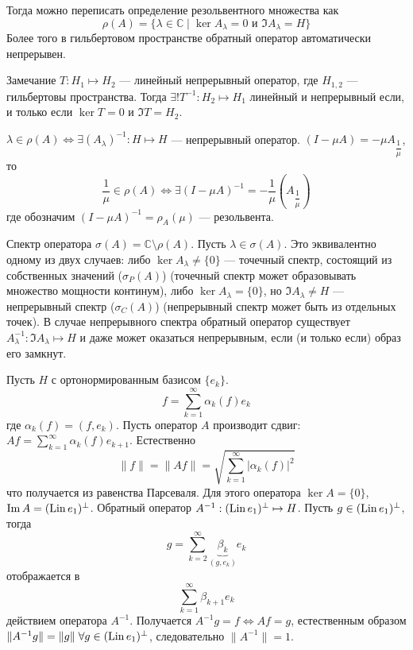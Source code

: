 \documentclass[14pt]{extarticle}
\begin{document}
Тогда можно переписать определение резольвентного множества как 
$$
\rho(A) = \{\lambda \in \mathbb C \mid \ker A_\lambda = 0\text{ и }\Im A_\lambda = H \}
$$
Более того в гильбертовом пространстве обратный оператор автоматически непрерывен.

\begin{MathCl}{Замечание}
    $T:H_1 \mapsto H_2$ --- линейный непрерывный оператор, где $H_{1,2}$ --- гильбертовы пространства.
    Тогда $\exists! T^{-1} : H_2 \mapsto H_1$ линейный и непрерывный если, и только если $\ker T = 0$ и $\Im T = H_2$.
\end{MathCl}

    $\lambda \in \rho(A) \Leftrightarrow \exists(A_\lambda)^{-1} : H \mapsto H$ --- непрерывный оператор.
    $(I - \mu A) = -\mu A_{\dfrac{1}{\mu}}$, то 
    $$
    \dfrac{1}{\mu} \in \rho(A) \Leftrightarrow \exists (I - \mu A)^{-1} = -\dfrac{1}{\mu}(A_{\dfrac{1}{\mu}})
    $$
    где обозначим $(I - \mu A)^{-1} = \rho_A(\mu)$ --- резольвента.
\begin{Opr}
    Спектр оператора $\sigma(A) = \mathbb C \setminus \rho(A)$. Пусть $\lambda \in \sigma(A)$.
    Это эквивалентно одному из двух случаев:
    либо $\ker A_\lambda \ne \{0\}$ --- точечный спектр, состоящий из собственных значений ($\sigma_P(A)$) (точечный спектр может образовывать множество мощности континум),
    либо $\ker A_\lambda = \{0\}$, но $\Im A_\lambda \ne H$ --- непрерывный спектр ($\sigma_C(A)$) (непрерывный спектр может быть из отдельных точек).
    В случае непрерывного спектра обратный оператор существует $A_\lambda^{-1} : \Im A_\lambda \mapsto H$ и даже может оказаться непрерывным, если (и только если) образ его
    замкнут.
\end{Opr}

\begin{Prim}
    Пусть $H$ с ортонормированным базисом $\{e_k\}$.
    $$
    f = \sum \limits_{k = 1}^{\infty} \alpha_k(f) e_k
    $$
    где $\alpha_k(f)=(f, e_k)$.
    Пусть оператор $A$ производит сдвиг: $Af = \sum \limits_{k = 1}^{\infty} \alpha_k(f) e_{k+1}$.
    Естественно 
    $$
    \|f\| = \|Af\| = \sqrt{\sum \limits_{k = 1}^{\infty} |\alpha_k(f)|^2}
    $$
    что получается из равенства Парсеваля.
    Для этого оператора
    $\ker A = \{0\}$, $\operatorname{Im} A = (\operatorname{Lin} e_1)^{\perp}$.
    Обратный оператор
    $A^{-1} : (\operatorname{Lin} e_1)^{\perp} \mapsto H$. Пусть $g \in (\operatorname{Lin} e_1)^{\perp}$, тогда
    $$
    g = \sum \limits_{k = 2}^{\infty}\underbrace{\beta_k}_{(g, e_k)}e_k
    $$ 
    отображается в 
    $$
    \sum\limits_{k = 1}^{\infty} \beta_{k + 1}e_k
    $$
    действием оператора $A^{-1}$.
    Получается $A^{-1}g = f \Leftrightarrow Af = g$, естественным образом $\|A^{-1}g\| = \|g\|\; \forall g \in (\operatorname{Lin} e_1)^{\perp}$, следовательно $\|A^{-1}\| = 1$.
\end{Prim}
\end{document}
